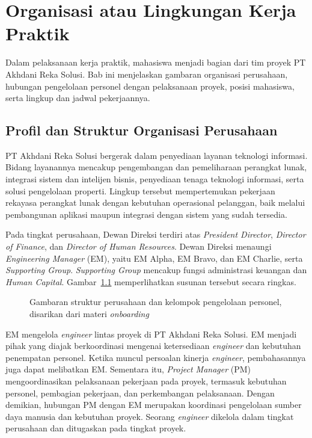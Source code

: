 \chapter{Organisasi atau Lingkungan Kerja Praktik}
Dalam pelaksanaan kerja praktik, mahasiswa menjadi bagian dari tim proyek PT Akhdani Reka Solusi. Bab ini menjelaskan gambaran organisasi perusahaan, hubungan pengelolaan personel dengan pelaksanaan proyek, posisi mahasiswa, serta lingkup dan jadwal pekerjaannya.

\section{Profil dan Struktur Organisasi Perusahaan}\label{sec:struktur-perusahaan}
PT Akhdani Reka Solusi bergerak dalam penyediaan layanan teknologi informasi. Bidang layanannya mencakup pengembangan dan pemeliharaan perangkat lunak, integrasi sistem dan intelijen bisnis, penyediaan tenaga teknologi informasi, serta solusi pengelolaan properti. Lingkup tersebut mempertemukan pekerjaan rekayasa perangkat lunak dengan kebutuhan operasional pelanggan, baik melalui pembangunan aplikasi maupun integrasi dengan sistem yang sudah tersedia.

Pada tingkat perusahaan, Dewan Direksi terdiri atas \textit{President Director}, \textit{Director of Finance}, dan \textit{Director of Human Resources}. Dewan Direksi menaungi \textit{Engineering Manager} (EM)\label{istilah:em}, yaitu EM Alpha, EM Bravo, dan EM Charlie, serta \textit{Supporting Group}. \textit{Supporting Group} mencakup fungsi administrasi keuangan dan \textit{Human Capital}. Gambar~\ref{fig:struktur-perusahaan} memperlihatkan susunan tersebut secara ringkas.

\begin{figure}[htbp]
\centering

\caption{Gambaran struktur perusahaan dan kelompok pengelolaan personel, disarikan dari materi \textit{onboarding}}
\label{fig:struktur-perusahaan}
\end{figure}

EM mengelola \textit{engineer} lintas proyek di PT Akhdani Reka Solusi. EM menjadi pihak yang diajak berkoordinasi mengenai ketersediaan \textit{engineer} dan kebutuhan penempatan personel. Ketika muncul persoalan kinerja \textit{engineer}, pembahasannya juga dapat melibatkan EM. Sementara itu, \textit{Project Manager} (PM)\label{istilah:pm} mengoordinasikan pelaksanaan pekerjaan pada proyek, termasuk kebutuhan personel, pembagian pekerjaan, dan perkembangan pelaksanaan. Dengan demikian, hubungan PM dengan EM merupakan koordinasi pengelolaan sumber daya manusia dan kebutuhan proyek. Seorang \textit{engineer} dikelola dalam tingkat perusahaan dan ditugaskan pada tingkat proyek.

